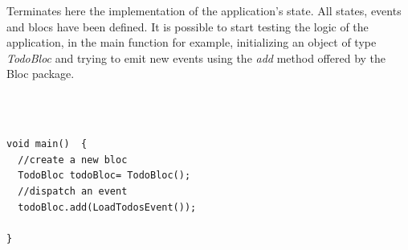 Terminates here the implementation of the application’s state. All states, events and blocs have been defined. It is possible to start testing the logic of the application, in the main function for example, initializing an object of type \textit{TodoBloc} and trying to emit new events using the \textit{add} method offered by the Bloc package.
\begin{code}
\mbox{}\\
 \mbox{}
\label{code:2.14}
\begin{verbatim}

void main()  {
  //create a new bloc
  TodoBloc todoBloc= TodoBloc();
  //dispatch an event
  todoBloc.add(LoadTodosEvent());
  
}
\end{verbatim}
\mbox{}
\end{code}

